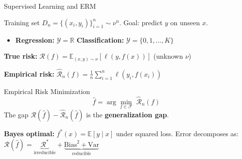 \documentclass[aspectratio=169, professionalfonts]{beamer}
\def\R{\mathbb{R}}
\def\E{\mathbb{E}}
\def\Var{\text{Var}}
\def\Bias{\text{Bias}}
\begin{document}
\begin{frame}{Supervised Learning and ERM}

Training set $D_n = \{(x_i, y_i)\}_{i=1}^n \sim \nu^n$. Goal: predict $y$ on unseen $x$.

\begin{itemize}
  \item \textbf{Regression:} $\mathcal{Y} = \R$ \quad \textbf{Classification:} $\mathcal{Y} = \{0,1,\ldots,K\}$
\end{itemize}

\bigskip

\textbf{True risk:} $\mathcal{R}(f) = \E_{(x,y)\sim\nu}[\ell(y, f(x))]$ (unknown $\nu$)

\textbf{Empirical risk:} $\hat{\mathcal{R}}_n(f) = \frac{1}{n}\sum_{i=1}^{n}\ell(y_i, f(x_i))$

\bigskip

\begin{block}{Empirical Risk Minimization}
$$\hat{f} = \arg\min_{f \in \mathcal{F}}\;\hat{\mathcal{R}}_n(f)$$
The gap $\mathcal{R}(\hat{f}) - \hat{\mathcal{R}}_n(\hat{f})$ is the \textbf{generalization gap}.
\end{block}

\bigskip

\textbf{Bayes optimal:} $f^*(x) = \E[y \mid x]$ under squared loss. Error decomposes as:
$\mathcal{R}(\hat{f}) = \underbrace{\mathcal{R}^*}_{\text{irreducible}} + \underbrace{\Bias^2 + \Var}_{\text{reducible}}$

\end{frame}
\end{document}
